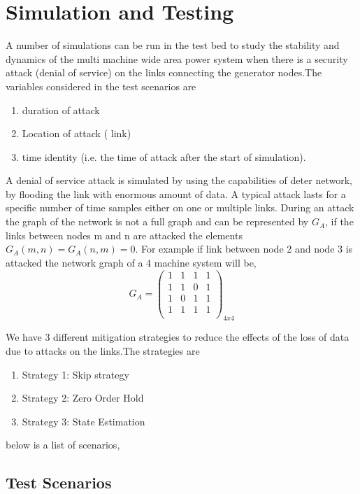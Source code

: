 \documentclass[a4paper]{article}
\begin{document}
\section{Simulation and Testing}

A number of simulations can be run in the test bed to study the stability and dynamics of the multi machine wide area power system when there is a security attack (denial of service) on the links connecting the generator nodes.The variables considered in the test scenarios are 
\begin{enumerate}
\item duration of attack
\item Location of attack ( link)
\item time identity (i.e. the time of attack after the start of simulation).
\end{enumerate}

A denial of service attack is simulated by using the capabilities of deter network, by flooding the link with enormous amount of data. A typical attack  lasts for a specific number of time samples either on one or multiple links. During an attack the graph of the network is not a full graph and can be represented by $G_{A}$, if the links between nodes m and n are attacked the elements $G_{A}(m,n) = G_{A}(n,m) = 0$. For example if link between node 2 and node 3 is attacked the network graph of a 4 machine system will be,
\begin{equation}
G_{A} = 
\begin{pmatrix}
1 &1 &1 &1\\
1 &1 &0 &1\\
1 &0 &1 &1\\
1 &1 &1 &1\\
\end{pmatrix}_{4x4}
\end{equation}

We have 3 different mitigation strategies to reduce the effects of the loss of data due to attacks on the links.The strategies are
\begin{enumerate}
\item Strategy 1: Skip strategy
\item Strategy 2: Zero Order Hold
\item Strategy 3: State Estimation
\end{enumerate}
below is a list of scenarios, 
\subsection{Test Scenarios} 
\end{document}
